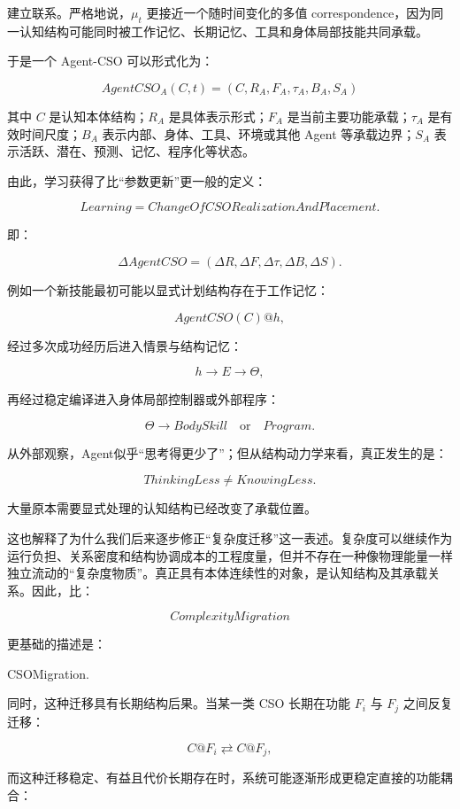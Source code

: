 建立联系。严格地说，\(\mu_t\) 更接近一个随时间变化的多值 correspondence，因为同一认知结构可能同时被工作记忆、长期记忆、工具和身体局部技能共同承载。

于是一个 Agent-CSO 可以形式化为：

\[
\boxed{
AgentCSO_A(C,t)
=
(C,R_A,F_A,\tau_A,B_A,S_A)
}
\]

其中 \(C\) 是认知本体结构；\(R_A\) 是具体表示形式；\(F_A\) 是当前主要功能承载；\(\tau_A\) 是有效时间尺度；\(B_A\) 表示内部、身体、工具、环境或其他 Agent 等承载边界；\(S_A\) 表示活跃、潜在、预测、记忆、程序化等状态。

由此，学习获得了比“参数更新”更一般的定义：

\[
\boxed{
Learning
=
ChangeOfCSORealizationAndPlacement.
}
\]

即：

\[
\Delta AgentCSO
=
(\Delta R,\Delta F,\Delta\tau,\Delta B,\Delta S).
\]

例如一个新技能最初可能以显式计划结构存在于工作记忆：

\[
AgentCSO(C)
@
h,
\]

经过多次成功经历后进入情景与结构记忆：

\[
h
\rightarrow
E
\rightarrow
\Theta,
\]

再经过稳定编译进入身体局部控制器或外部程序：

\[
\Theta
\rightarrow
BodySkill
\quad \text{or}\quad
Program.
\]

从外部观察，Agent似乎“思考得更少了”；但从结构动力学来看，真正发生的是：

\[
\boxed{
ThinkingLess
\neq
KnowingLess.
}
\]

大量原本需要显式处理的认知结构已经改变了承载位置。

这也解释了为什么我们后来逐步修正“复杂度迁移”这一表述。复杂度可以继续作为运行负担、关系密度和结构协调成本的工程度量，但并不存在一种像物理能量一样独立流动的“复杂度物质”。真正具有本体连续性的对象，是认知结构及其承载关系。因此，比：

\[
ComplexityMigration
\]

更基础的描述是：

\begin{statementbox}
CSOMigration.
\end{statementbox}

同时，这种迁移具有长期结构后果。当某一类 CSO 长期在功能 \(F_i\) 与 \(F_j\) 之间反复迁移：

\[
C@F_i
\rightleftarrows
C@F_j,
\]

而这种迁移稳定、有益且代价长期存在时，系统可能逐渐形成更稳定直接的功能耦合：

